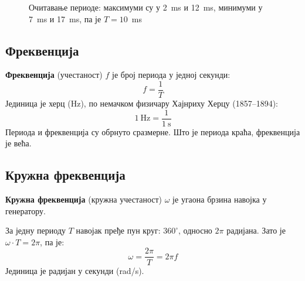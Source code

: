 \documentclass{article}
\begin{document}
\begin{figure}[H]
    \centering
    \caption{Очитавање периоде: максимуми су у 2~ms и 12~ms, минимуми у 7~ms и 17~ms, па је $T = 10$~ms}
    \label{fig:perioda}
\end{figure}

\subsection{Фреквенција}

\textbf{Фреквенција} (учестаност) $f$ је број периода у једној секунди:
\begin{equation}
    f = \frac{1}{T}
\end{equation}
Јединица је херц (Hz), по немачком физичару Хајнриху Херцу (1857--1894):
\[
    1~\mathrm{Hz} = \frac{1}{1~\mathrm{s}}
\]
Периода и фреквенција су обрнуто сразмерне. Што је периода краћа, фреквенција је већа.

\subsection{Кружна фреквенција}

\textbf{Кружна фреквенција} (кружна учестаност) $\omega$ је угаона брзина навојка у генератору.

За једну периоду $T$ навојак пређе пун круг: $360^\circ$, односно $2\pi$ радијана. Зато је $\omega\cdot T = 2\pi$, па је:
\begin{equation}
    \omega = \frac{2\pi}{T} = 2\pi f
\end{equation}
Јединица је радијан у секунди (rad/s).
\end{document}
